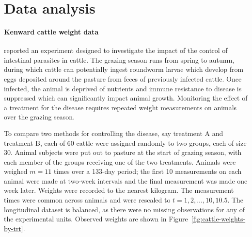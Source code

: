 
\chapter{Data analysis} \label{data-analysis-chapter}
\subsubsection{Kenward cattle weight data}

\cite{kenward1987method} reported an experiment designed to investigate the impact of the control of intestinal parasites in cattle. The grazing season runs from spring to autumn, during which cattle can potentially ingest roundworm larvae which develop from eggs deposited around the pasture from feces of previously infected cattle. Once infected, the animal is deprived of nutrients and immune resistance to disease is suppressed which can significantly impact animal growth. Monitoring the effect of a treatment for the disease requires repeated weight measurements on animals over the grazing season. 

\bigskip

To compare two methods for controlling the disease, say treatment A and treatment B, each of 60 cattle were assigned randomly to two groups, each of size 30. Animal subjects were put out to pasture at the start of grazing season, with each member of the groups receiving one of the two treatments. Animals were weighed $m = 11$ times over a 133-day period; the first 10 measurements on each animal were made at two-week intervals and the final measurement was made one week later. Weights were recorded to the nearest kilogram. The measurement times were common across animals and were rescaled to $t = 1, 2, \dots, 10, 10.5$. The longitudinal dataset is balanced, as there were no missing observations for any of the experimental units. Observed weights are shown in Figure~\ref{fig:cattle-weights-by-trt}.
  
